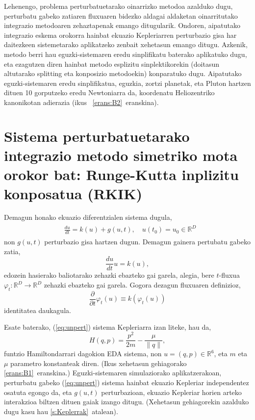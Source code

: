  Lehenengo, problema perturbatuetarako oinarrizko metodoa azalduko dugu,  perturbatu gabeko zatiaren fluxuaren bidezko aldagai aldaketan oinarritutako   integrazio metodoaren zehaztapenak emango ditugularik.
Ondoren, aipatutako integrazio eskema orokorra  hainbat ekuazio Kepleriarren perturbazio gisa har daitezkeen sistemetarako aplikatzeko zenbait xehetasun emango ditugu.  Azkenik,  metodo berri hau eguzki-sistemaren eredu sinplifikatu baterako aplikatuko dugu, eta ezagutzen diren hainbat metodo esplizitu sinplektikorekin (doitasun altutarako splitting eta konposizio metodoekin) konparatuko dugu.
Aipatutako eguzki-sistemaren eredu sinplifikatua, eguzkia, zortzi planetak, eta Pluton hartzen dituen 10 gorputzeko eredu Newtoniarra da, koordenatu Heliozentriko kanonikotan adierazia  (ikus ~\ref{erans:B2}~eranskina).


\section{Sistema perturbatuetarako integrazio metodo simetriko mota orokor bat: Runge-Kutta inplizitu konposatua (RKIK)}
 \label{s:RKIK}


 Demagun honako ekuazio diferentzialen sistema dugula,
\begin{align}
\begin{split}
\label{eq:pertEDA}
&\frac{du}{dt} = k(u) + g(u,t), \quad  u(t_0) = u_0 \in \mathbb{R}^D
\end{split}
\end{align}
non $g(u,t)$ perturbazio gisa hartzen dugun. Demagun gainera pertubatu gabeko zatia,
\begin{equation}
\label{eq:unpert}
\frac{du}{dt} u = k(u),
\end{equation}
%
edozein hasierako baliotarako zehazki ebazteko gai garela, alegia, bere $t$-fluxua $\varphi_{t}: \mathbb{R}^{D} \to \mathbb{R}^{D}$
 zehazki ebazteko gai garela. Gogora dezagun fluxuaren definizioz,
 \begin{equation}
 \label{eq:fluxudef}
\frac{\partial}{\partial t} \varphi_{t}(u) \equiv k(\varphi_{t}(u))
\end{equation}
%
identitatea daukagula.

Esate baterako,   (\ref{eq:unpert}) sistema Kepleriarra izan liteke, hau da,
\begin{equation}
\label{eq: hamkepler}
H(q,p)=\frac{p^2}{2m}-\frac{\mu}{\|q\|},
\end{equation}
funtzio Hamiltondarrari dagokion EDA sistema, non $u=(q,p) \in \mathbb{R}^{6}$, eta
$m$ eta $\mu$ parametro konstanteak diren. (Ikus xehetasun gehiagorako  \ref{erans:B1}~eranskina.)
Eguzki-sistemaren simulaziorako aplikatzerakoan, perturbatu gabeko (\ref{eq:unpert}) sistema hainbat ekuazio Kepleriar independentez osatuta egongo da, eta $g(u,t)$ perturbazioan, ekuazio Kepleriar horien arteko interakzioa biltzen dituen gaiak izango ditugu. (Xehetasun gehiagorekin azalduko dugu kasu hau \ref{s:Keplerrak}~atalean).


